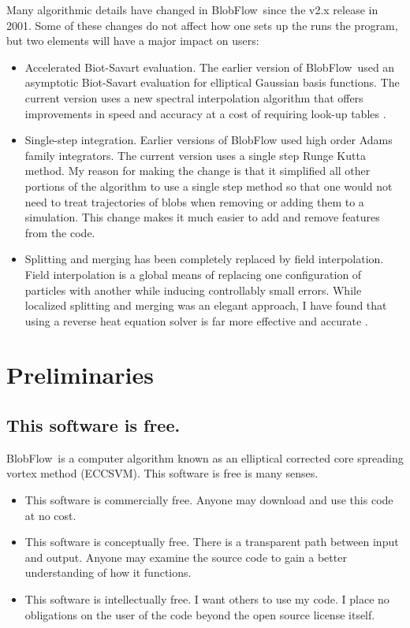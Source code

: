 \documentclass[12pt]{report}
\newcommand{\BF}{BlobFlow}
\begin{document}
Many algorithmic details have changed in \BF~since the v2.x release in
2001.  Some of these changes do not affect how one sets up the runs the program,
but two elements will have a major impact on users:
\begin{itemize}
\item Accelerated Biot-Savart evaluation.  The earlier version of \BF~used an
asymptotic Biot-Savart evaluation for elliptical Gaussian basis functions.  The
current version uses a new spectral interpolation algorithm that offers
improvements in speed and accuracy at a cost of requiring look-up tables
\cite{platte-rossi-mitchell}.

 \item Single-step integration.  Earlier versions of BlobFlow used high order
Adams family integrators.  The current version uses a single step Runge Kutta
method.  My reason for making the change is that it simplified all other
portions of the algorithm to use a single step method so that one would not need
to treat trajectories of blobs when removing or adding them to a simulation. 
This change makes it much easier to add and remove features from the code.

\item Splitting and merging has been completely replaced by field interpolation.
 Field interpolation is a global means of replacing one configuration of
particles with another while inducing controllably small errors.  While
localized splitting and merging was an elegant approach, I have found that using
a  reverse heat equation solver is far more effective and accurate
\cite{barba-rossi}.
\end{itemize}


\chapter{Preliminaries}

\section{This software is free.}

\BF~is a computer algorithm known as an elliptical corrected core
spreading vortex method (ECCSVM).  This software is free is many senses.
\begin{itemize}
 \item  This software is commercially free.  Anyone may download and use this
code at no cost.
\item This software is conceptually free.  There is a transparent path between
input and output.  Anyone may examine the source code to gain a better
understanding of how it functions.
\item This software is intellectually free.  I want others to use my code.  I
place no obligations on the user of the code beyond the open source license
itself.
\end{itemize}
\end{document}
